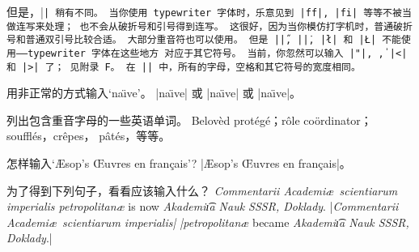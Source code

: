 \danger 但是，|\tt| 稍有不同。%
当你使用 typewriter 字体时，乐意见到 |ff|, |fi| 等等不被当做连写来处理；
也不会从破折号和引号得到连写。
这很好，因为当你模仿打字机时，普通破折号和普通双引号比较合适。%
大部分重音符也可以使用。%
但是 |\H|, |\.|, |\l| 和 |\L| 不能使用——typewriter 字体在这些地方%
对应于其它符号。%
当前，你忽然可以输入 |"|, \|, |<| 和 |>| 了；
见附录 F。%
在 |\tt| 中，所有的字母，空格和其它符号的宽度相同。

\exercise 用非正常的方式输入`na\"\i ve'。
\answer |na\"\i ve| 或 |na{\"\i}ve| 或 |na\"{\i}ve|。

\exercise 列出包含重音字母的一些英语单词。
\answer Belov\`ed prot\'eg\'e；r\^ole co\"ordinator；souffl\'es，cr\^epes，
p\^at\'es，等等。

\exercise 怎样输入`\AE sop's \OE uvres en fran\c cais'\thinspace?
\answer |\AE sop's \OE uvres en fran\c cais|。

\exercise 为了得到下列句子，看看应该输入什么？
{\sl Commentarii Academi\ae\ scientiarum imperialis petropolitan\ae\/} is now
{\sl Akademi\t\i a Nauk SSSR, Doklady}.
\answer |{\sl Commentarii Academi\ae\ scientiarum imperialis|\hfil\break
|petropolitan\ae\/} became {\sl Akademi\t\i a Nauk SSSR, Doklady}.|

